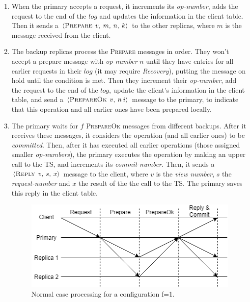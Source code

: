\documentclass[times, 10pt,twocolumn]{article}
\begin{document}
\begin{enumerate}
  \item When the primary accepts a request, it increments its \textit{op-number}, adds the request
  to the end of the $log$ and updates the information in the client table. Then it sends
  a $\left \langle \textsc{Prepare} \: \: v, \: m, \: n, \: k \right \rangle$ to the other 
  replicas, where $m$ is the message received from the client.
  
  \item The backup replicas process the \textsc{Prepare} messages in order. They won’t accept a prepare message
  with \textit{op-number} $n$ until they have entries for all earlier requests in their $log$ (it may
  require \textit{Recovery}), putting the message on hold until the condition is met. Then 
  they increment their \textit{op-number}, add the request to the end of the $log$, update
  the client's information in the client table, and send a 
  $\left \langle \textsc{PrepareOk} \: \: v, \: n \: i\right \rangle$
  message to the primary, to indicate that this operation and all earlier ones have been
  prepared locally.
  
  \item The primary waits for $f$ \textsc{PrepareOk} messages from different backups. 
  After it receives these messages, it considers the operation (and all earlier ones) to be \textit{committed}. 
  Then, after it has executed all earlier operations (those assigned smaller \textit{op-numbers}), 
  the primary executes the operation by making an upper call to the TS, and increments its \textit{commit-number}.
  Then, it sends a $\left \langle \textsc{Reply} \: \: v, \: s, \: x\right \rangle$ message
  to the client, where $v$ is the \textit{view number}, $s$ the \textit{request-number} and $x$ the result
  of the the call to the TS. The primary saves this reply in the client table.

\begin{figure}[h]
\centering
\includegraphics[width=1\linewidth]{images/dad_smr_normal.png}
\caption{Normal case processing for a configuration f=1.}
\label{fig:smr_normal_case}
\end{figure}


\end{enumerate}
\end{document}
